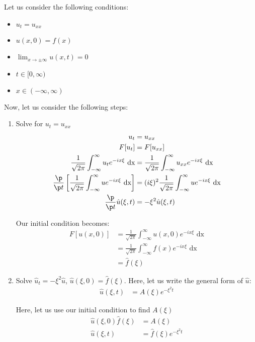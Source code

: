 Let us consider the following conditions:
%
\begin{itemize}
  \item $u_t = u_{xx}$
  \item $u(x, 0) = f(x)$
  \item $\displaystyle \lim_{x \to \pm \infty} u(x, t) = 0$
  \item $t \in [0, \infty)$
  \item $x \in (-\infty, \infty)$
\end{itemize}

Now, let us consider the following steps:
%
\begin{enumerate}
  \item Solve for $u_t = u_{xx}$
  \begin{align}
    u_t & = u_{xx}\\
    F[u_t] & = F[u_{xx}]\\
    \frac{1}{\sqrt{2 \pi}} \int^\infty_{-\infty} u_t e^{-i x \xi} \text{ dx} & = \frac{1}{\sqrt{2 \pi}} \int^\infty_{-\infty} u_{xx} e^{-i x \xi} \text{ dx}\\
    \frac{\p}{\p t} \left[ \frac{1}{\sqrt{2 \pi}} \int^\infty_{-\infty} u e^{-i x \xi} \text{ dx} \right]
    & = (i \xi)^2 \frac{1}{\sqrt{2 \pi}} \int^\infty_{-\infty} u e^{-i x \xi} \text{ dx}\\
    \frac{\p}{\p t} \hat u(\xi, t) & = - \xi^2 \hat u(\xi, t)
  \end{align}

  Our initial condition becomes:
  \begin{align}
    F[u(x, 0)] & = \frac{1}{\sqrt{2 \pi}} \int^\infty_{-\infty} u(x, 0) e^{-i x \xi} \text{ dx}\\
    & = \frac{1}{\sqrt{2 \pi}} \int^\infty_{-\infty} f(x) e^{-i x \xi} \text{ dx}\\
    & = \hat f(\xi)
  \end{align}
  \item Solve $\hat u_t = -\xi^2 \hat u$, $\hat u(\xi, 0) = \hat f(\xi)$. Here, let us write the general form of $\hat u$:
  \begin{align}
    \hat u(\xi, t) & = A(\xi) e^{- \xi^2 t}
  \end{align}

  Here, let us use our initial condition to find $A(\xi)$
  \begin{align}
    \hat u (\xi, 0) \hat f(\xi) & = A(\xi)\\
    \hat u(\xi, t) & = \hat f(\xi) e^{-\xi^2 t}
  \end{align}


\end{enumerate}
